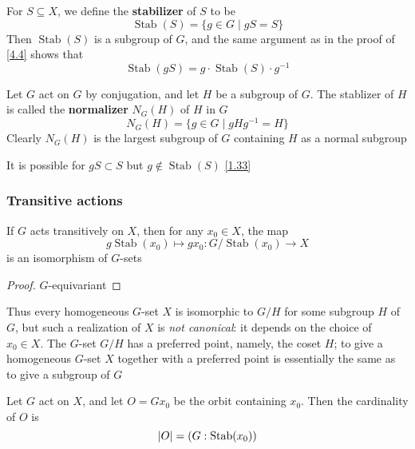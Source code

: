 \documentclass[11pt]{article}
\DeclareMathOperator{\Stab}{Stab}
\begin{document}
For \(S\subseteq X\), we define the \textbf{stabilizer} of \(S\) to be
\begin{equation*}
\Stab(S)=\{g\in G\mid gS=S\}
\end{equation*}
Then \(\Stab(S)\) is a subgroup of \(G\), and the same argument as in the proof of \ref{4.4}
shows that
\begin{equation*}
\Stab(gS)=g\cdot\Stab(S)\cdot g^{-1}
\end{equation*}

\begin{examplle}[]
Let \(G\) act on \(G\) by conjugation, and let \(H\) be a subgroup of \(G\). The stablizer
of \(H\) is called the \textbf{normalizer} \(N_G(H)\) of \(H\) in \(G\)
\begin{equation*}
N_G(H)=\{g\in G\mid gHg^{-1}=H\}
\end{equation*}
Clearly \(N_G(H)\) is the largest subgroup of \(G\) containing \(H\) as a normal subgroup
\end{examplle}
It is possible for \(gS\subset S\) but \(g\notin\Stab(S)\) \ref{1.33}

\subsubsection{Transitive actions}
\label{sec:orgd7f4443}
\begin{proposition}[]
If \(G\) acts transitively on \(X\), then for any \(x_0\in X\), the map
\begin{equation*}
g\Stab(x_0)\mapsto gx_0:G/\Stab(x_0)\to X
\end{equation*}
is an isomorphism of \(G\)-sets
\end{proposition}

\begin{proof}
\(G\)-equivariant
\end{proof}

Thus every homogeneous \(G\)-set \(X\) is isomorphic to \(G/H\) for some subgroup \(H\)
of \(G\), but such a realization of \(X\) is \emph{not canonical}: it depends on the choice
of \(x_0\in X\). The \(G\)-set \(G/H\) has a preferred point, namely, the coset \(H\); to give a
homogeneous \(G\)-set \(X\) together with a preferred point is essentially the same as to give a
subgroup of \(G\)

\begin{corollary}[]
Let \(G\) act on \(X\), and let \(O=Gx_0\) be the orbit containing \(x_0\). Then the cardinality
of \(O\) is
\begin{equation*}
\abs{O}=(G:\Stab(x_0))
\end{equation*}
\end{corollary}
\end{document}
